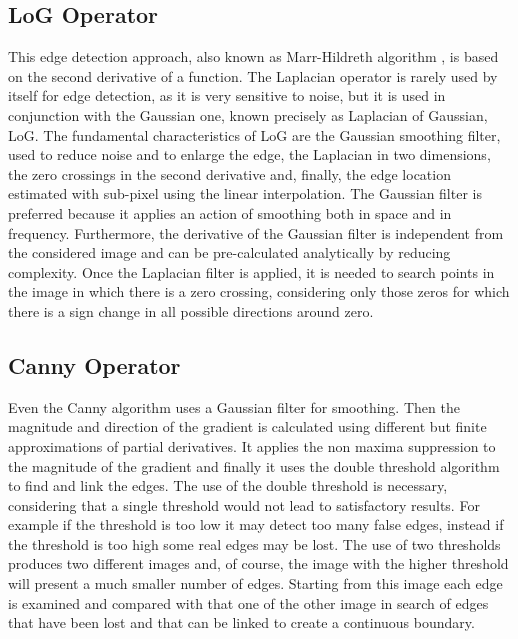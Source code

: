 \documentclass[final,a4paper,12pt,english]{UnicaPhdThesis3}
\begin{document}
\subsection{LoG Operator} %
This edge detection approach, also known as Marr-Hildreth algorithm \cite{Marr}, is based on the second derivative of a function. The Laplacian operator is rarely used by itself for edge detection, as it is very sensitive to noise, but it is used in conjunction with the Gaussian one, known precisely as Laplacian of Gaussian, LoG. The fundamental characteristics of LoG are the Gaussian smoothing filter, used to reduce noise and to enlarge the edge, the Laplacian in two dimensions, the zero crossings in the second derivative and, finally, the edge location estimated with sub-pixel using the linear interpolation. The Gaussian filter is preferred because it applies an action of smoothing both in space and in frequency. Furthermore, the derivative of the Gaussian filter is independent from the considered image and can be pre-calculated analytically by reducing complexity. Once the Laplacian filter is applied, it is needed to search points in the image in which there is a zero crossing, considering only those zeros for which there is a sign change in all possible directions around zero.

\subsection{Canny Operator} %
Even the Canny algorithm \cite{Canny} uses a Gaussian filter for smoothing. Then the magnitude and direction of the gradient is calculated using different but finite approximations of partial derivatives. It applies the non maxima suppression to the magnitude of the gradient and finally it uses the double threshold algorithm to find and link the edges. The use of the double threshold is necessary, considering that a single threshold would not lead to satisfactory results. For example if the threshold is too low it may detect too many false edges, instead if the threshold is too high some real edges may be lost. The use of two thresholds produces two different images and, of course, the image with the higher threshold will present a much smaller number of edges. Starting from this image each edge is examined and compared with that one of the other image in search of edges that have been lost and that can be linked to create a continuous boundary.
\end{document}

